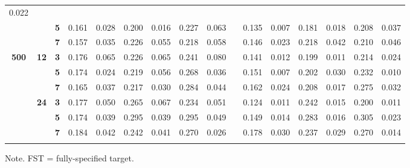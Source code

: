 \documentclass[a4paper,man,natbib]{apa6}
\begin{document}
\begin{linenumbers}
\begin{table}[h]
\begin{center}
{\begin{tabular}{cccccccccccccccc}
		0.022 \\ \cline{3-16} 
		&
		&
		\textbf{5} &
		0.161 &
		0.028 &
		0.200 &
		0.016 &
		0.227 &
		0.063 &
		&
		0.135 &
		0.007 &
		0.181 &
		0.018 &
		0.208 &
		0.037 \\ \cline{3-16} 
		&
		&
		\textbf{7} &
		0.157 &
		0.035 &
		0.226 &
		0.055 &
		0.218 &
		0.058 &
		&
		0.146 &
		0.023 &
		0.218 &
		0.042 &
		0.210 &
		0.046 \\ \hline
		\multirow{6}{*}{\textbf{500}} &
		\multirow{3}{*}{\textbf{12}} &
		\textbf{3} &
		0.176 &
		0.065 &
		0.226 &
		0.065 &
		0.241 &
		0.080 &
		&
		0.141 &
		0.012 &
		0.199 &
		0.011 &
		0.214 &
		0.024 \\ \cline{3-16} 
		&
		&
		\textbf{5} &
		0.174 &
		0.024 &
		0.219 &
		0.056 &
		0.268 &
		0.036 &
		&
		0.151 &
		0.007 &
		0.202 &
		0.030 &
		0.232 &
		0.010 \\ \cline{3-16} 
		&
		&
		\textbf{7} &
		0.165 &
		0.037 &
		0.217 &
		0.030 &
		0.284 &
		0.044 &
		&
		0.162 &
		0.024 &
		0.208 &
		0.017 &
		0.275 &
		0.032 \\ \cline{2-16} 
		&
		\multirow{3}{*}{\textbf{24}} &
		\textbf{3} &
		0.177 &
		0.050 &
		0.265 &
		0.067 &
		0.234 &
		0.051 &
		&
		0.124 &
		0.011 &
		0.242 &
		0.015 &
		0.200 &
		0.011 \\ \cline{3-16} 
		&
		&
		\textbf{5} &
		0.174 &
		0.039 &
		0.295 &
		0.039 &
		0.295 &
		0.049 &
		&
		0.149 &
		0.014 &
		0.283 &
		0.016 &
		0.305 &
		0.023 \\ \cline{3-16} 
		&
		&
		\textbf{7} &
		0.184 &
		0.042 &
		0.242 &
		0.041 &
		0.270 &
		0.026 &
		&
		0.178 &
		0.030 &
		0.237 &
		0.029 &
		0.270 &
		0.014 \\ \hline
		\multicolumn{1}{l}{} &
		\multicolumn{1}{l}{} &
		\multicolumn{1}{l}{} &
		&
		&
		&
		&
		&
		&
		&
		&
		&
		&
		&
		&
		
	\end{tabular}%
}
 \begin{tablenotes}[flushleft]
	\small
	\item 	Note. FST = fully-specified target.
\end{tablenotes}
	\end{center}
\end{table}


\end{linenumbers}
\end{document}
